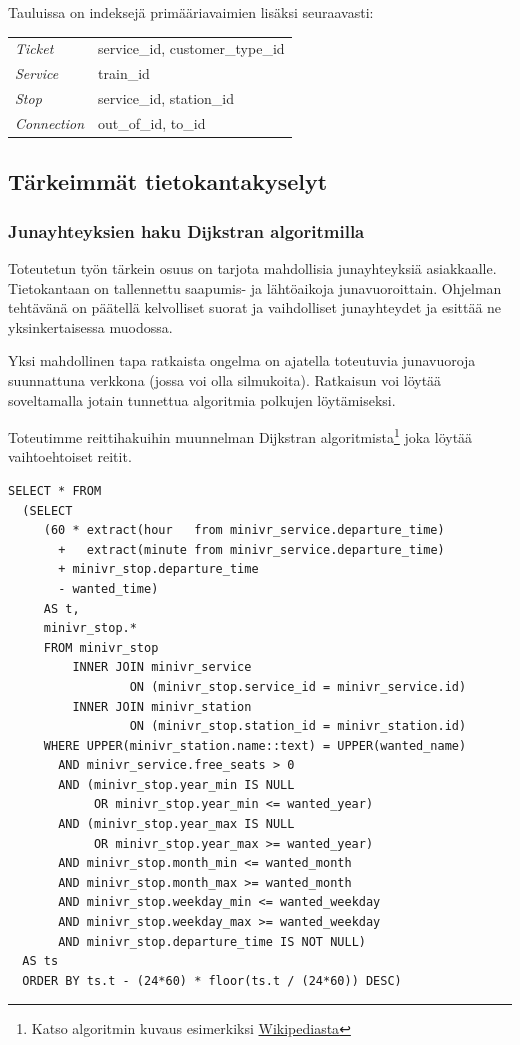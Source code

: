 \documentclass[a4paper,twoside,titlepage,12pt]{article}
\begin{document}
Tauluissa on indeksejä primääriavaimien lisäksi seuraavasti:

\begin{tabular}{ll}
\emph{Ticket} & service\_id, customer\_type\_id\\
\emph{Service} & train\_id\\
\emph{Stop} & service\_id, station\_id\\
\emph{Connection} & out\_of\_id, to\_id\\
\end{tabular}

\subsection{Tärkeimmät tietokantakyselyt}

\subsubsection{Junayhteyksien haku Dĳkstran algoritmilla}
Toteutetun työn tärkein osuus on tarjota mahdollisia junayhteyksiä asiakkaalle. Tietokantaan on tallennettu saapumis- ja lähtöaikoja junavuoroittain. Ohjelman tehtävänä on päätellä kelvolliset suorat ja vaihdolliset junayhteydet ja esittää ne yksinkertaisessa muodossa.

Yksi mahdollinen tapa ratkaista ongelma on ajatella toteutuvia junavuoroja suunnattuna verkkona (jossa voi olla silmukoita). Ratkaisun voi löytää soveltamalla jotain tunnettua algoritmia polkujen löytämiseksi.

Toteutimme reittihakuihin muunnelman Dĳkstran algoritmista\footnote{Katso algoritmin kuvaus esimerkiksi \href{http://fi.wikipedia/Dijkstran\_algoritmi}{Wikipediasta}} joka löytää vaihtoehtoiset reitit.

\lstset{language=SQL,caption=Eräs alkupisteet hakeva kyselylause}
\begin{lstlisting}
SELECT * FROM
  (SELECT
     (60 * extract(hour   from minivr_service.departure_time)
       +   extract(minute from minivr_service.departure_time)
       + minivr_stop.departure_time
       - wanted_time)
     AS t,
     minivr_stop.*
     FROM minivr_stop
         INNER JOIN minivr_service
                 ON (minivr_stop.service_id = minivr_service.id)
         INNER JOIN minivr_station
                 ON (minivr_stop.station_id = minivr_station.id)
     WHERE UPPER(minivr_station.name::text) = UPPER(wanted_name)
       AND minivr_service.free_seats > 0
       AND (minivr_stop.year_min IS NULL
            OR minivr_stop.year_min <= wanted_year)
       AND (minivr_stop.year_max IS NULL
            OR minivr_stop.year_max >= wanted_year)
       AND minivr_stop.month_min <= wanted_month
       AND minivr_stop.month_max >= wanted_month
       AND minivr_stop.weekday_min <= wanted_weekday
       AND minivr_stop.weekday_max >= wanted_weekday
       AND minivr_stop.departure_time IS NOT NULL)
  AS ts
  ORDER BY ts.t - (24*60) * floor(ts.t / (24*60)) DESC)
\end{lstlisting}
\end{document}
